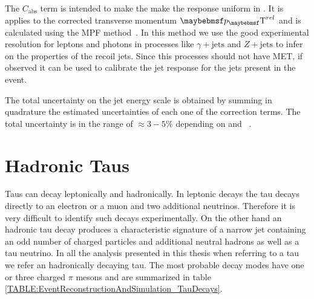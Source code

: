 The $C_{\text{abs}}$ term is intended to make the make the response uniform in \pt. It is applies to the \eta corrected transverse momentum $\pT^{rel}$ and is calculated using the \gls{MPF} method~\cite{ARTICLE:CDFDijetAngularDistribution}. In this method we use the good experimental resolution for leptons and photons in processes like $\gamma + \text{jets}$ and $Z + \text{jets}$ to infer on the properties of the recoil jets. Since this processes should not have \gls{MET}, if observed it can be used to calibrate the jet response for the jets present in the event.

The total uncertainty on the jet energy scale is obtained by summing in quadrature the estimated uncertainties of each one of the correction terms. The total uncertainty is in the range of $\approx 3-5\%$ depending on \pt and \eta~\cite{ARTICLE:CMSDeterminationJetEnergyCalibration}.


\section{Hadronic Taus}
\label{SECTION:EventReconstructionAndSimulation_Taus}


Taus can decay leptonically and hadronically. In leptonic decays the tau decays directly to an electron or a muon and two additional neutrinos. Therefore it is very difficult to identify such decays experimentally. On the other hand an hadronic tau decay produces a characteristic signature of a narrow jet containing an odd number of charged particles and additional neutral hadrons as well as a tau neutrino. In all the analysis presented in this thesis when referring to a tau we refer an hadronically decaying tau. The most probable decay modes have one or three charged $\pi$ mesons and are summarized in table \ref{TABLE:EventReconstructionAndSimulation_TauDecays}. 

